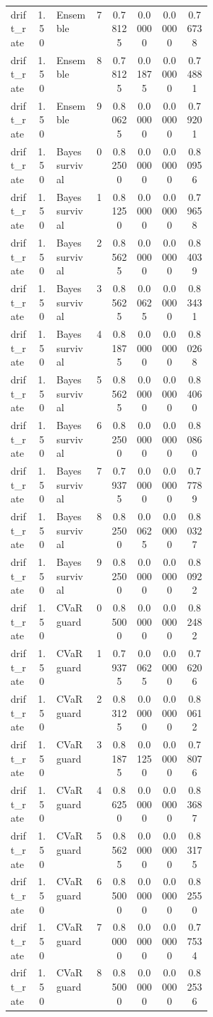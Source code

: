 \documentclass{article}
\begin{document}
\begin{center}
\begin{longtable}{p{0.13\linewidth}cp{0.20\linewidth}ccccc}
drift\_rate & 1.50 & Ensemble & 7 & 0.78125 & 0.00000 & 0.00000 & 0.76738\\
drift\_rate & 1.50 & Ensemble & 8 & 0.78125 & 0.01875 & 0.00000 & 0.74881\\
drift\_rate & 1.50 & Ensemble & 9 & 0.80625 & 0.00000 & 0.00000 & 0.79201\\
drift\_rate & 1.50 & Bayes survival & 0 & 0.82500 & 0.00000 & 0.00000 & 0.80956\\
drift\_rate & 1.50 & Bayes survival & 1 & 0.81250 & 0.00000 & 0.00000 & 0.79658\\
drift\_rate & 1.50 & Bayes survival & 2 & 0.85625 & 0.00000 & 0.00000 & 0.84039\\
drift\_rate & 1.50 & Bayes survival & 3 & 0.85625 & 0.00625 & 0.00000 & 0.83431\\
drift\_rate & 1.50 & Bayes survival & 4 & 0.81875 & 0.00000 & 0.00000 & 0.80268\\
drift\_rate & 1.50 & Bayes survival & 5 & 0.85625 & 0.00000 & 0.00000 & 0.84060\\
drift\_rate & 1.50 & Bayes survival & 6 & 0.82500 & 0.00000 & 0.00000 & 0.80860\\
drift\_rate & 1.50 & Bayes survival & 7 & 0.79375 & 0.00000 & 0.00000 & 0.77789\\
drift\_rate & 1.50 & Bayes survival & 8 & 0.82500 & 0.00625 & 0.00000 & 0.80327\\
drift\_rate & 1.50 & Bayes survival & 9 & 0.82500 & 0.00000 & 0.00000 & 0.80922\\
drift\_rate & 1.50 & CVaR guard & 0 & 0.85000 & 0.00000 & 0.00000 & 0.82482\\
drift\_rate & 1.50 & CVaR guard & 1 & 0.79375 & 0.00625 & 0.00000 & 0.76206\\
drift\_rate & 1.50 & CVaR guard & 2 & 0.83125 & 0.00000 & 0.00000 & 0.80612\\
drift\_rate & 1.50 & CVaR guard & 3 & 0.81875 & 0.01250 & 0.00000 & 0.78076\\
drift\_rate & 1.50 & CVaR guard & 4 & 0.86250 & 0.00000 & 0.00000 & 0.83687\\
drift\_rate & 1.50 & CVaR guard & 5 & 0.85625 & 0.00000 & 0.00000 & 0.83175\\
drift\_rate & 1.50 & CVaR guard & 6 & 0.85000 & 0.00000 & 0.00000 & 0.82550\\
drift\_rate & 1.50 & CVaR guard & 7 & 0.80000 & 0.00000 & 0.00000 & 0.77534\\
drift\_rate & 1.50 & CVaR guard & 8 & 0.85000 & 0.00000 & 0.00000 & 0.82536\\

\end{longtable}
\end{center}
\end{document}
